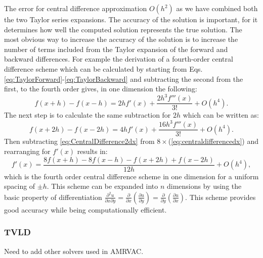 \documentclass[12pt]{ociamthesis}
\begin{document}
The  error for central difference approximation $O(h^{2})$ as we have combined both the two Taylor series expansions. The accuracy of the solution is important, for it determines how well the computed solution represents the true solution. The most obvious way to increase the accuracy of the solution is to increase the number of terms included from the Taylor expansion of the forward and backward differences. For example the derivation of a fourth-order central difference scheme which can be calculated by starting from Eqs. \eqref{eq:TaylorForward}-\eqref{eq:TaylorBackward} and subtracting the second from the first, to the fourth order gives, in one dimension the following:
\begin{equation}
f(x+h)-f(x-h)=2 h f'(x)+\frac{2 h^{3} f'''(x)}{3!}+O(h^{4}).\label{eq:centraldifferencedx}
\end{equation}
The next step is to calculate the same subtraction for $2 h$ which can be written as:
\begin{equation}
f(x+2 h)-f(x-2 h)=4 h f'(x)+\frac{16 h^{3}f'''(x)}{3!}+O(h^{4}).\label{eq:CentralDifference2dx}
\end{equation}
Then subtracting \eqref{eq:CentralDifference2dx} from $8\times$(\eqref{eq:centraldifferencedx}) and rearranging for $f'(x)$ results in:
\begin{equation}
f'(x)=\frac{8f(x+h)-8f(x-h)-f(x+2h)+f(x-2h)}{12h}+O(h^{4}),\label{eq:4thOrderCentralDifferenceUniform}
\end{equation}
which is the fourth order central difference scheme in one dimension for a uniform spacing of $\pm h$.
This scheme can be expanded into $n$ dimensions by using the basic property of differentiation $\frac{\partial^{2}u}{\partial x\partial y}=\frac{\partial}{\partial x}\left(\frac{\partial u}{\partial y}\right)=\frac{\partial}{\partial y}\left(\frac{\partial u}{\partial x}\right)$. This scheme provides good accuracy while being computationally efficient.
\subsubsection{TVLD}
Need to add other solvers used in AMRVAC.
\end{document}
